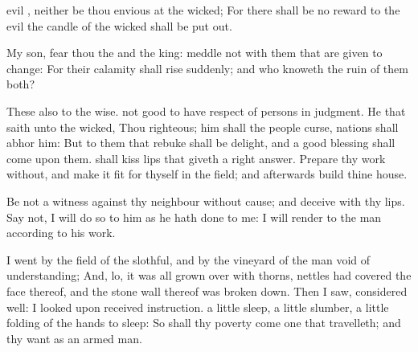 {evil
{}, neither be thou
envious at the
wicked;
For there shall be no
reward to the
evil
{} the
candle of the
wicked shall be put
out.
\par }{\PP {}My
son,
fear thou the
{} and the
king:
{}
meddle not with them that are given to
change:
For their
calamity shall
rise
suddenly; and who
knoweth the
ruin of them
both?
\par }{\PP {}These
{} also
{} to the
wise.
{} not
good to have
respect of
persons in
judgment.
He that
saith unto the
wicked, Thou
{}
righteous; him shall the
people
curse,
nations shall
abhor him:
But to them that
rebuke
{} shall be
delight, and a
good
blessing shall
come upon them.
 shall
kiss
{}
lips that
giveth a
right
answer.
Prepare thy
work
without, and make it
fit for thyself in the
field; and
afterwards
build thine
house.
\par }{\PP {}Be not a
witness against thy
neighbour without
cause; and
deceive
{} with thy
lips.
Say not, I will
do so to him as he hath
done to me: I will
render to the
man according to his
work.
\par }{\PP {}I
went by the
field of the
slothful, and by the
vineyard of the
man
void of
understanding;
And, lo, it was all grown
over with
thorns,
{}
nettles had
covered the
face thereof, and the
stone
wall thereof was broken
down.
Then I
saw,
{} considered
{}
well: I
looked upon
{}
received
instruction.
 a
little
sleep, a
little
slumber, a
little
folding of the
hands to
sleep:
So shall thy
poverty
come
{} one that
travelleth; and thy
want as an
armed
man.

}
